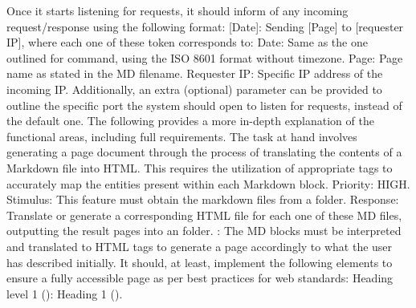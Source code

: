 {}Once it starts listening for requests, it should inform of any incoming request/response using the following format: [Date]: Sending [Page] to [requester IP], where each one of these token corresponds to:\markdownRendererInterblockSeparator
{}\markdownRendererUlBeginTight
\markdownRendererUlItem Date: Same as the one outlined for  command, using the ISO 8601 format without timezone.\markdownRendererUlItemEnd 
\markdownRendererUlItem Page: Page name as stated in the MD filename.\markdownRendererUlItemEnd 
\markdownRendererUlItem Requester IP: Specific IP address of the incoming IP.\markdownRendererUlItemEnd 
\markdownRendererUlEndTight \markdownRendererInterblockSeparator
{}Additionally, an extra (optional) parameter can be provided to outline the specific port the system should open to listen for requests, instead of the default one.\markdownRendererInterblockSeparator
{}\markdownRendererInterblockSeparator
{}The following provides a more in-depth explanation of the functional areas, including full requirements.\markdownRendererInterblockSeparator
{}\markdownRendererInterblockSeparator
{}\markdownRendererInterblockSeparator
{}The task at hand involves generating a page document through the process of translating the contents of a Markdown file into HTML. This requires the utilization of appropriate tags to accurately map the entities present within each Markdown block. Priority: HIGH.\markdownRendererInterblockSeparator
{}\markdownRendererInterblockSeparator
{}Stimulus: This feature must obtain the markdown files from a  folder.\markdownRendererInterblockSeparator
{}Response: Translate or generate a corresponding HTML file for each one of these MD files, outputting the result pages into an  folder.\markdownRendererInterblockSeparator
{}\markdownRendererInterblockSeparator
{}: The MD blocks must be interpreted and translated to HTML tags to generate a page accordingly to what the user has described initially. It should, at least, implement the following elements to ensure a fully accessible page as per best practices for web standards:\markdownRendererInterblockSeparator
{}\markdownRendererUlBeginTight
\markdownRendererUlItem Heading level 1 (\markdownRendererCodeSpan{\markdownRendererHash{}}): Heading 1 ().\markdownRendererUlItemEnd 
